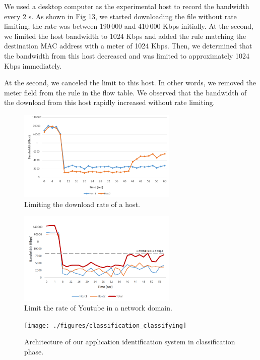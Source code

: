 \documentclass[conference]{IEEEtran}
\begin{document}
We used a desktop computer as the experimental host to record the bandwidth every 2 s. As shown in Fig 13, we started downloading the file without rate limiting; the rate was between 190 000 and 410 000 Kbps initially. At the  second, we limited the host bandwidth to 1024 Kbps and added the rule matching the destination MAC address with a meter of 1024 Kbps. Then, we determined that the bandwidth from this host decreased and was limited to approximately 1024 Kbps immediately.

At the  second, we canceled the limit to this host. In other words, we removed the meter field from the rule in the flow table. We observed that the bandwidth of the download from this host rapidly increased without rate limiting.

\begin{figure}[!t]
\centering
\includegraphics[width=3in]{./figures/qos_limit_host}
\caption{Limiting the download rate of a host.}
\label{fig:qos_limit_host}
\end{figure}

\begin{figure}[!t]
\centering
\includegraphics[width=3in]{./figures/mft_qos_rate_domain_app}
\caption{Limit the rate of Youtube in a network domain.}
\label{fig:mft_qos_rate_domain_app}
\end{figure}

\begin{figure}[!t]
\centering
\texttt{[image: ./figures/classification\_classifying]}
\caption{Architecture of our application identification system in classification phase.}
\label{fig:class_classifying}
\end{figure}
\end{document}
